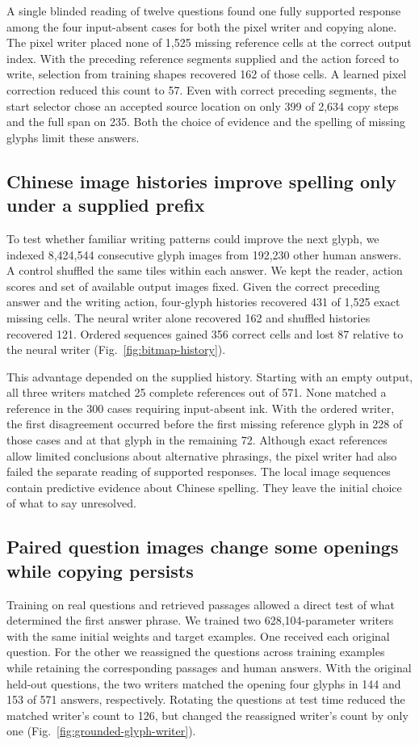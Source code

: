 \documentclass[12pt,a4paper]{article}
\providecommand{\DIFadd}[1]{{\protect\color{blue} \sf #1}} %
\begin{document}
\DIFadd{A single blinded reading of twelve questions found one fully supported response among the four input-absent cases for both the pixel writer and copying alone. The pixel writer placed none of 1,525 missing reference cells at the correct output index. With the preceding reference segments supplied and the action forced to write, selection from training shapes recovered 162 of those cells. A learned pixel correction reduced this count to 57. Even with correct preceding segments, the start selector chose an accepted source location on only 399 of 2,634 copy steps and the full span on 235. Both the choice of evidence and the spelling of missing glyphs limit these answers.
}

\subsection*{\DIFadd{Chinese image histories improve spelling only under a supplied prefix}}
\DIFadd{To test whether familiar writing patterns could improve the next glyph, we indexed 8,424,544 consecutive glyph images from 192,230 other human answers. A control shuffled the same tiles within each answer. We kept the reader, action scores and set of available output images fixed. Given the correct preceding answer and the writing action, four-glyph histories recovered 431 of 1,525 exact missing cells. The neural writer alone recovered 162 and shuffled histories recovered 121. Ordered sequences gained 356 correct cells and lost 87 relative to the neural writer (Fig.~\ref{fig:bitmap-history}).
}

\DIFadd{This advantage depended on the supplied history. Starting with an empty output, all three writers matched 25 complete references out of 571. None matched a reference in the 300 cases requiring input-absent ink. With the ordered writer, the first disagreement occurred before the first missing reference glyph in 228 of those cases and at that glyph in the remaining 72. Although exact references allow limited conclusions about alternative phrasings, the pixel writer had also failed the separate reading of supported responses. The local image sequences contain predictive evidence about Chinese spelling. They leave the initial choice of what to say unresolved.
}

\subsection*{\DIFadd{Paired question images change some openings while copying persists}}
\DIFadd{Training on real questions and retrieved passages allowed a direct test of what determined the first answer phrase. We trained two 628,104-parameter writers with the same initial weights and target examples. One received each original question. For the other we reassigned the questions across training examples while retaining the corresponding passages and human answers. With the original held-out questions, the two writers matched the opening four glyphs in 144 and 153 of 571 answers, respectively. Rotating the questions at test time reduced the matched writer's count to 126, but changed the reassigned writer's count by only one (Fig.~\ref{fig:grounded-glyph-writer}).
}
\end{document}
